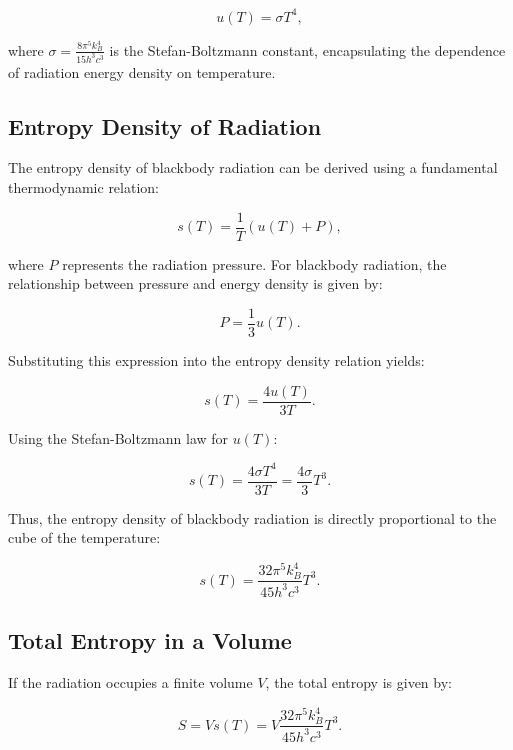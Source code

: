  \begin{equation*}
  u(T) = \sigma T^4,
 \end{equation*}

 where $\sigma = \frac{8 \pi^5 k_B^4}{15 h^3 c^3}$ is the Stefan-Boltzmann constant, encapsulating the dependence of radiation energy density on temperature.

 \subsection*{Entropy Density of Radiation}
 The entropy density of blackbody radiation can be derived using a fundamental thermodynamic relation:

 \begin{equation*}
  s(T) = \frac{1}{T} \left( u(T) + P \right),
 \end{equation*}

 where $P$ represents the radiation pressure. For blackbody radiation, the relationship between pressure and energy density is given by:

 \begin{equation*}
  P = \frac{1}{3} u(T).
 \end{equation*}

 Substituting this expression into the entropy density relation yields:

 \begin{equation*}
  s(T) = \frac{4 u(T)}{3 T}.
 \end{equation*}

 Using the Stefan-Boltzmann law for $u(T)$:

 \begin{equation*}
  s(T) = \frac{4 \sigma T^4}{3 T} = \frac{4 \sigma}{3} T^3.
 \end{equation*}

 Thus, the entropy density of blackbody radiation is directly proportional to the cube of the temperature:

 \begin{equation*}
  s(T) = \frac{32 \pi^5 k_B^4}{45 h^3 c^3} T^3.
 \end{equation*}

 \subsection*{Total Entropy in a Volume}
 If the radiation occupies a finite volume $V$, the total entropy is given by:

 \begin{equation*}
  S = V s(T) = V \frac{32 \pi^5 k_B^4}{45 h^3 c^3} T^3.
 \end{equation*}

